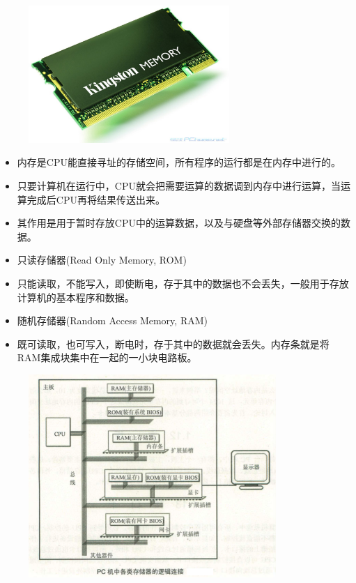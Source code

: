 \begin{frame}
\begin{figure}
\centering
\includegraphics[width=3in]{slide01/images/memory} 
\end{figure}
\end{frame}
 
\begin{frame}
\begin{itemize}
\item
内存是CPU能直接寻址的存储空间，所有程序的运行都是在内存中进行的。\\[0.1in]
\item
只要计算机在运行中，CPU就会把需要运算的数据调到内存中进行运算，当运算完成后CPU再将结果传送出来。\\[0.1in]
\item
其作用是用于暂时存放CPU中的运算数据，以及与硬盘等外部存储器交换的数据。\\[0.1in]
\end{itemize}
 \end{frame}
 
 \begin{frame}
 

\begin{itemize}
\item 只读存储器(Read Only Memory, ROM) 
\item[] 只能读取，不能写入，即使断电，存于其中的数据也不会丢失，一般用于存放计算机的基本程序和数据。\\[0.1in] 
\item 随机存储器(Random Access Memory, RAM) 
\item[] 既可读取，也可写入，断电时，存于其中的数据就会丢失。{内存条就是将RAM集成块集中在一起的一小块电路板。}\\[0.2in]

\end{itemize}
 \end{frame}
 
\begin{frame}[fragile]
\begin{figure}[h] 
\centering
\includegraphics[width=3.7in]{slide01/images/PCLink}
\end{figure}
\end{frame}
